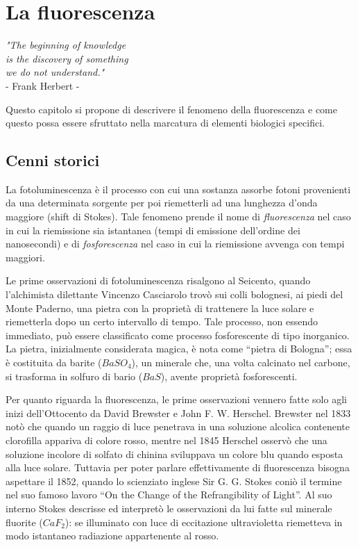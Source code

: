 \clearpage{\pagestyle{empty}\cleardoublepage}

\chapter{La fluorescenza}

\begin{flushright}\begin{small}\textit{"The beginning of knowledge\\
 is the discovery of something\\ we do not understand."}\\
- Frank Herbert -\\
\end{small}\end{flushright}

Questo capitolo si propone di descrivere il fenomeno della fluorescenza e come questo possa essere sfruttato nella marcatura di elementi biologici specifici.


\section{Cenni storici}

La fotoluminescenza è il processo con cui una sostanza assorbe fotoni provenienti da una determinata sorgente per poi riemetterli ad una lunghezza d'onda maggiore (shift di Stokes). 
Tale fenomeno prende il nome di \textit{fluorescenza} nel caso in cui la riemissione sia istantanea (tempi di emissione dell'ordine dei nanosecondi) e di \textit{fosforescenza} nel caso in cui la riemissione avvenga con tempi maggiori. 

Le prime osservazioni di fotoluminescenza risalgono al Seicento, quando l'alchimista dilettante Vincenzo Casciarolo trovò sui colli bolognesi, ai piedi del Monte Paderno, una pietra con la proprietà di trattenere la luce solare e riemetterla dopo un certo intervallo di tempo. 
Tale processo, non essendo immediato, può essere classificato come processo fosforescente di tipo inorganico. 
La pietra, inizialmente considerata magica, è nota come ``pietra di Bologna''; essa è costituita da barite ($BaSO_4$), un minerale che, una volta calcinato nel carbone, si trasforma in solfuro di bario ($BaS$), avente proprietà fosforescenti. 

Per quanto riguarda la fluorescenza, le prime osservazioni vennero fatte solo agli inizi dell'Ottocento da David Brewster e John F. W. Herschel. Brewster nel 1833 notò che quando un raggio di luce penetrava in una soluzione alcolica contenente clorofilla appariva di colore rosso, mentre nel 1845 Herschel osservò che una soluzione incolore di solfato di chinina sviluppava un colore blu quando esposta alla luce solare. 
Tuttavia per poter parlare effettivamente di fluorescenza bisogna aspettare il 1852, quando lo scienziato inglese Sir G. G. Stokes coniò il termine nel suo famoso lavoro ``On the Change of the Refrangibility of Light''. 
Al suo interno Stokes descrisse ed interpretò le osservazioni da lui fatte sul minerale fluorite ($CaF_2$): se illuminato con luce di eccitazione ultravioletta riemetteva in modo istantaneo radiazione appartenente al rosso. 

